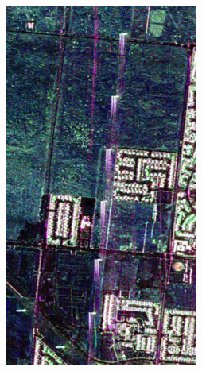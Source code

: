 \begin{figure}[t]
\centering
\begin{subfigure}[b]{0.18\columnwidth}
		\includegraphics[width=\textwidth]{Figures/CD/ADD/a}
		\caption{}
\end{subfigure}
\hspace{0.01pt}
\begin{subfigure}[b]{0.18\columnwidth}

\end{subfigure}
\end{figure}
